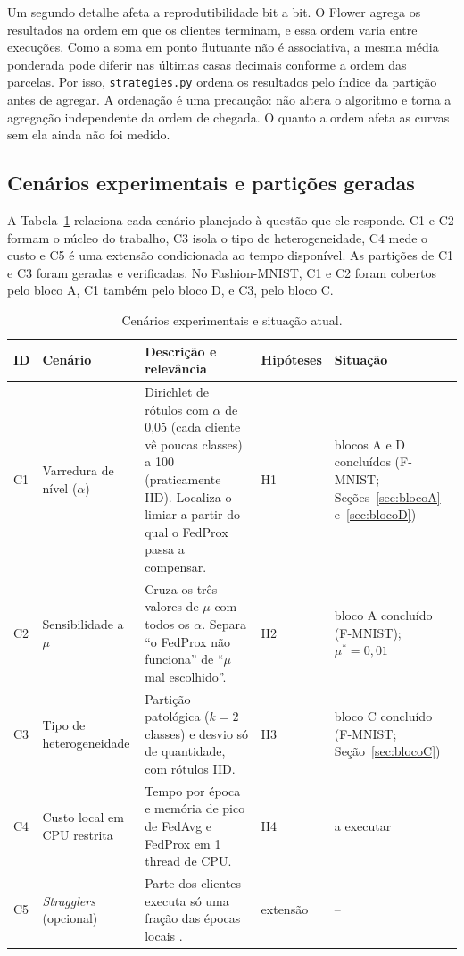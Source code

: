 Um segundo detalhe afeta a reprodutibilidade bit a bit. O Flower agrega os resultados na ordem em que os clientes terminam, e essa ordem varia entre execuções. Como a soma em ponto flutuante não é associativa, a mesma média ponderada pode diferir nas últimas casas decimais conforme a ordem das parcelas. Por isso, \texttt{strategies.py} ordena os resultados pelo índice da partição antes de agregar. A ordenação é uma precaução: não altera o algoritmo e torna a agregação independente da ordem de chegada. O quanto a ordem afeta as curvas sem ela ainda não foi medido.

\subsection{Cenários experimentais e partições geradas}
\label{sec:cenarios}

A Tabela~\ref{tab:cenarios} relaciona cada cenário planejado à questão que ele responde. C1 e C2 formam o núcleo do trabalho, C3 isola o tipo de heterogeneidade, C4 mede o custo e C5 é uma extensão condicionada ao tempo disponível. As partições de C1 e C3 foram geradas e verificadas. No Fashion-MNIST, C1 e C2 foram cobertos pelo bloco A, C1 também pelo bloco D, e C3, pelo bloco C.

\begin{table}[t]
    \centering\small
    \caption{Cenários experimentais e situação atual.}
    \label{tab:cenarios}
    \begin{tabular}{@{}p{0.6cm}p{3.2cm}p{7.4cm}p{1.6cm}p{2.6cm}@{}}
        \toprule
        ID & Cenário & Descrição e relevância & Hipóteses & Situação \\
        \midrule
        C1 & Varredura de nível ($\alpha$) & Dirichlet de rótulos com $\alpha$ de 0,05 (cada cliente vê poucas classes) a 100 (praticamente IID). Localiza o limiar a partir do qual o FedProx passa a compensar. & H1 & blocos A e D concluídos (F-MNIST; Seções~\ref{sec:blocoA} e~\ref{sec:blocoD}) \\
        C2 & Sensibilidade a $\mu$ & Cruza os três valores de $\mu$ com todos os $\alpha$. Separa ``o FedProx não funciona'' de ``$\mu$ mal escolhido''. & H2 & bloco A concluído (F-MNIST); $\mu^* = 0{,}01$ \\
        C3 & Tipo de heterogeneidade & Partição patológica ($k = 2$ classes) e desvio só de quantidade, com rótulos IID. & H3 & bloco C concluído (F-MNIST; Seção~\ref{sec:blocoC}) \\
        C4 & Custo local em CPU restrita & Tempo por época e memória de pico de FedAvg e FedProx em 1 thread de CPU. & H4 & a executar \\
        C5 & \textit{Stragglers} (opcional) & Parte dos clientes executa só uma fração das épocas locais \citep{li2020fedprox}. & extensão & -- \\
        \bottomrule
    \end{tabular}
\end{table}

